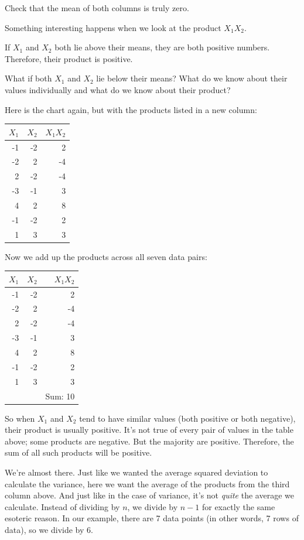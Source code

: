 \documentclass[
]{book}
\begin{document}
Check that the mean of both columns is truly zero.

Something interesting happens when we look at the product \(X_{1}X_{2}\).

If \(X_{1}\) and \(X_{2}\) both lie above their means, they are both positive numbers. Therefore, their product is positive.

What if both \(X_{1}\) and \(X_{2}\) lie below their means? What do we know about their values individually and what do we know about their product?

Here is the chart again, but with the products listed in a new column:

\begin{longtable}[]{@{}rrr@{}}
\toprule
\(X_{1}\) & \(X_{2}\) & \(X_{1}X_{2}\) \\
\midrule
\endhead
-1 & -2 & 2 \\
-2 & 2 & -4 \\
2 & -2 & -4 \\
-3 & -1 & 3 \\
4 & 2 & 8 \\
-1 & -2 & 2 \\
1 & 3 & 3 \\
\bottomrule
\end{longtable}

Now we add up the products across all seven data pairs:

\begin{longtable}[]{@{}rrr@{}}
\toprule
\(X_{1}\) & \(X_{2}\) & \(X_{1}X_{2}\) \\
\midrule
\endhead
-1 & -2 & 2 \\
-2 & 2 & -4 \\
2 & -2 & -4 \\
-3 & -1 & 3 \\
4 & 2 & 8 \\
-1 & -2 & 2 \\
1 & 3 & 3 \\
& & Sum: 10 \\
\bottomrule
\end{longtable}

So when \(X_{1}\) and \(X_{2}\) tend to have similar values (both positive or both negative), their product is usually positive. It's not true of every pair of values in the table above; some products are negative. But the majority are positive. Therefore, the sum of all such products will be positive.

We're almost there. Just like we wanted the average squared deviation to calculate the variance, here we want the average of the products from the third column above. And just like in the case of variance, it's not \emph{quite} the average we calculate. Instead of dividing by \(n\), we divide by \(n - 1\) for exactly the same esoteric reason. In our example, there are 7 data points (in other words, 7 rows of data), so we divide by 6.
\end{document}
